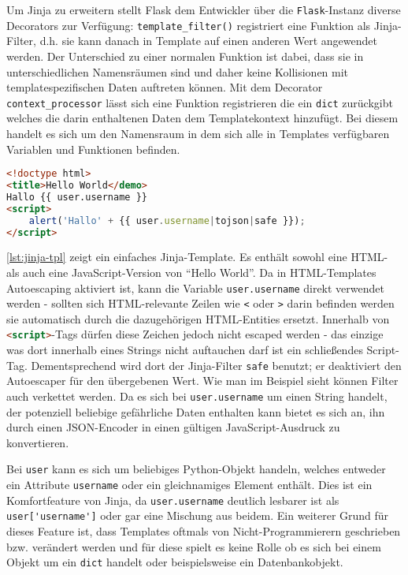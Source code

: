 Um Jinja zu erweitern stellt Flask dem Entwickler über die \lstinline{Flask}-Instanz diverse
Decorators zur Verfügung: \lstinline{template_filter()} registriert eine Funktion als Jinja-Filter,
d.h. sie kann danach in Template auf einen anderen Wert angewendet werden. Der Unterschied zu einer
normalen Funktion ist dabei, dass sie in unterschiedlichen Namensräumen sind und daher keine
Kollisionen mit templatespezifischen Daten auftreten können. Mit dem Decorator
\lstinline{context_processor} lässt sich eine Funktion registrieren die ein \lstinline{dict}
zurückgibt welches die darin enthaltenen Daten dem Templatekontext hinzufügt. Bei diesem handelt es
sich um den Namensraum in dem sich alle in Templates verfügbaren Variablen und Funktionen befinden.

\begin{lstlisting}[language=HTML,caption=Jinja2-Template,label=lst:jinja-tpl]
<!doctype html>
<title>Hello World</demo>
Hallo {{ user.username }}
<script>
    alert('Hallo' + {{ user.username|tojson|safe }});
</script>
\end{lstlisting}

\autoref{lst:jinja-tpl} zeigt ein einfaches Jinja-Template. Es enthält sowohl eine HTML- als auch
eine JavaScript-Version von \enquote{Hello World}. Da in HTML-Templates Autoescaping aktiviert ist,
kann die Variable \lstinline{user.username} direkt verwendet werden - sollten sich HTML-relevante
Zeilen wie \lstinline{<} oder \lstinline{>} darin befinden werden sie automatisch durch die
dazugehörigen HTML-Entities ersetzt. Innerhalb von \lstinline[language=HTML]{<script>}-Tags dürfen
diese Zeichen jedoch nicht escaped werden - das einzige was dort innerhalb eines Strings nicht
auftauchen darf ist ein schließendes Script-Tag.  Dementsprechend wird dort der Jinja-Filter
\lstinline{safe} benutzt; er deaktiviert den Autoescaper für den übergebenen Wert. Wie man im
Beispiel sieht können Filter auch verkettet werden. Da es sich bei \lstinline{user.username} um
einen String handelt, der potenziell beliebige gefährliche Daten enthalten kann bietet es sich an,
ihn durch einen JSON-Encoder in einen gültigen JavaScript-Ausdruck zu konvertieren.

Bei \lstinline{user} kann es sich um beliebiges Python-Objekt handeln, welches entweder ein
Attribute \lstinline{username} oder ein gleichnamiges Element enthält. Dies ist ein Komfortfeature
von Jinja, da \lstinline{user.username} deutlich lesbarer ist als \lstinline{user['username']} oder
gar eine Mischung aus beidem. Ein weiterer Grund für dieses Feature ist, dass Templates oftmals von
Nicht-Programmierern geschrieben bzw. verändert werden und für diese spielt es keine Rolle ob es
sich bei einem Objekt um ein \lstinline{dict} handelt oder beispielsweise ein Datenbankobjekt.
